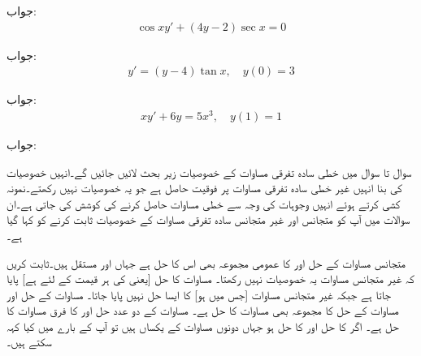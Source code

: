 جواب:
\begin{align*}
\cos x y'+(4y-2)\sec x=0
\end{align*}

جواب:
\begin{align*}
y'=(y-4)\tan x, \quad y(0)=3
\end{align*}

جواب:
\begin{align*}
xy'+6y=5x^3, \quad y(1)=1
\end{align*}

جواب:

سوال  تا سوال  میں خطی سادہ تفرقی مساوات کے خصوصیات زیر بحث لائیں جائیں گے۔انہیں خصوصیات کی بنا انہیں غیر خطی سادہ تفرقی مساوات پر فوقیت حاصل ہے جو یہ خصوصیات نہیں رکھتے۔نمونہ کشی کرتے ہوئے انہیں وجوہات کی وجہ سے خطی مساوات حاصل کرنے کی کوشش کی جاتی ہے۔ان سوالات میں آپ کو متجانس اور غیر متجانس سادہ تفرقی مساوات کے خصوصیات ثابت کرنے کو کہا گیا ہے۔



متجانس مساوات  کے حل  اور  کا عمومی مجموعہ  بھی اس کا حل ہے جہاں  اور  مستقل ہیں۔ثابت کریں کہ غیر متجانس مساوات  یہ خصوصیات نہیں رکھتا۔
مساوات  کا  حل  [یعنی  کی ہر قیمت کے لئے  ہے]  پایا جاتا ہے جبکہ غیر متجانس مساوات  [جس میں  ہو] کا ایسا حل نہیں پایا جاتا۔
مساوات  کے حل  اور مساوات  کے حل  کا مجموعہ  بھی مساوات  کا حل ہے۔ 
مساوات  کے دو عدد حل  اور  کا فرق  مساوات  کا حل ہے۔ 
اگر  کا حل  اور  کا حل  ہو جہاں دونوں مساوات کے  یکساں ہیں تو آپ  کے بارے میں کیا کہہ سکتے ہیں۔


